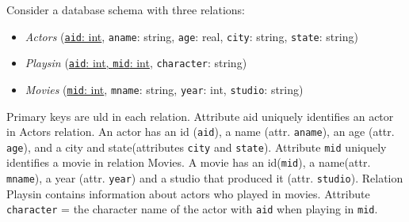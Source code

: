 \documentclass[letterpaper, 11pt]{article}
\begin{document}
Consider a database schema with three relations:
\begin{itemize}
    \item \textit{Actors} (\ul{\texttt{aid}: int}, \texttt{aname}: string, \texttt{age}: real, \texttt{city}: string, \texttt{state}: string)
    \item \textit{Playsin} (\ul{\texttt{aid}: int, \texttt{mid}: int}, \texttt{character}: string)
    \item \textit{Movies} (\ul{\texttt{mid}: int}, \texttt{mname}: string, \texttt{year}: int, \texttt{studio}: string)
\end{itemize}

Primary keys are uld in each relation. Attribute aid uniquely identifies an actor in Actors relation. An actor has an id (\texttt{aid}), a name (attr. \texttt{aname}), an age (attr. \texttt{age}), and a city and state(attributes \texttt{city} and \texttt{state}). Attribute \texttt{mid} uniquely identifies a movie in relation Movies. A movie has an id(\texttt{mid}), a name(attr. \texttt{mname}), a year (attr. \texttt{year}) and a studio that produced it (attr. \texttt{studio}). Relation Playsin contains information about actors who played in movies. Attribute \texttt{character} = the character name of the actor with \texttt{aid} when playing in \texttt{mid}.
\end{document}
